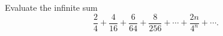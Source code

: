 Evaluate the infinite sum
\[
\dfrac{2}{4}+\dfrac{4}{16}+\dfrac{6}{64}+\dfrac{8}{256}+\cdots+\dfrac{2n}{4^n}+\cdots .
\]
